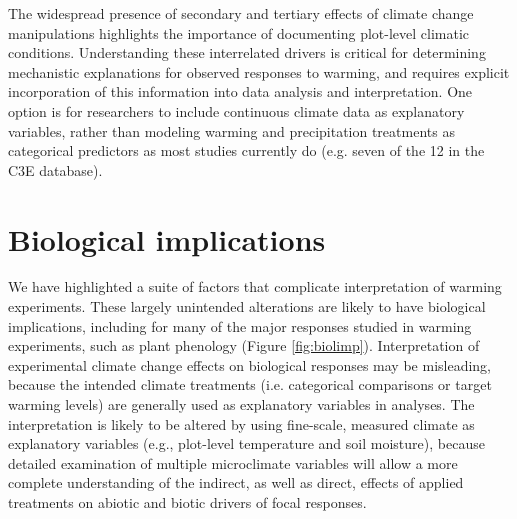 \documentclass{article}
\begin{document}
\par The widespread presence of secondary and tertiary effects of climate change manipulations highlights the importance of 
documenting plot-level climatic conditions. Understanding these interrelated drivers is critical for determining mechanistic explanations for observed responses to warming, and requires explicit incorporation of this information into data analysis and interpretation. One option is for researchers to include continuous climate data as explanatory variables, rather than modeling warming and precipitation treatments as categorical predictors as most studies currently do (e.g. seven of the 12 in the C3E database). 

\section* {Biological implications}

\par We have highlighted a suite of factors that complicate interpretation of warming experiments. These largely unintended alterations are likely to have biological implications, including for many of the major responses studied in warming experiments, such as plant phenology (Figure \ref{fig:biolimp}). Interpretation of experimental climate change effects on biological responses may be misleading, because the intended climate treatments (i.e. categorical comparisons or target warming levels) are generally used as explanatory variables in analyses. The interpretation is likely to be altered by using fine-scale, measured climate as explanatory variables (e.g., plot-level temperature and soil moisture), because detailed examination of multiple microclimate variables will allow a more complete understanding of the indirect, as well as direct, effects of applied treatments on abiotic and biotic drivers of focal responses.
\end{document}

